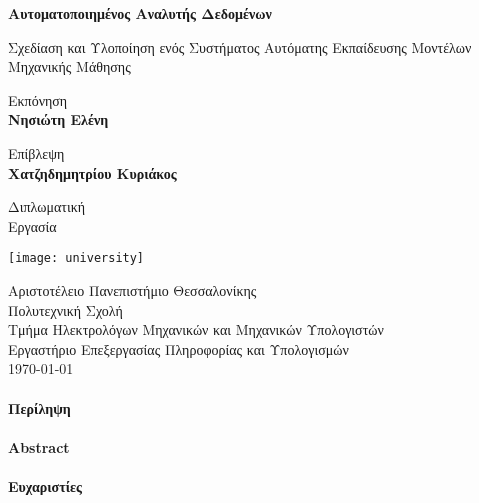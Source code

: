 \begin{titlepage}
	\begin{center}
		\vspace*{1cm}
		
		\Huge
		\textbf{Αυτοματοποιημένος Αναλυτής Δεδομένων}
		
		\vspace{0.5cm}
		\LARGE
		Σχεδίαση και Υλοποίηση ενός Συστήματος Αυτόματης Εκπαίδευσης Μοντέλων Μηχανικής Μάθησης
		
		\vspace{1.5cm}
		
		Εκπόνηση \\
		\textbf{Νησιώτη Ελένη}
		
		\vspace{1.5cm}
		
		Επίβλεψη \\
		\textbf{Χατζηδημητρίου Κυριάκος}
		
		\vspace{1.5cm}
		
		Διπλωματική\\
		Εργασία		
		\vspace{0.3cm}
		
		\texttt{[image: university]}
		
		\Large
		Αριστοτέλειο Πανεπιστήμιο Θεσσαλονίκης\\
		Πολυτεχνική Σχολή\\
		Τμήμα Ηλεκτρολόγων Μηχανικών και Μηχανικών Υπολογιστών\\
		Εργαστήριο Επεξεργασίας Πληροφορίας και Υπολογισμών\\		
		\today
		
	\end{center}
\end{titlepage}

{
	\titleformat{\paragraph}[display]{\normalfont\Large\bfseries\centering}{\theparagraph}{1em}{}
	\paragraph{Περίληψη}
	\newpage
	\paragraph{Abstract}
	\newpage
	\paragraph{Ευχαριστίες}
	\newpage
}


\tableofcontents
\listoffigures
\listoftables


